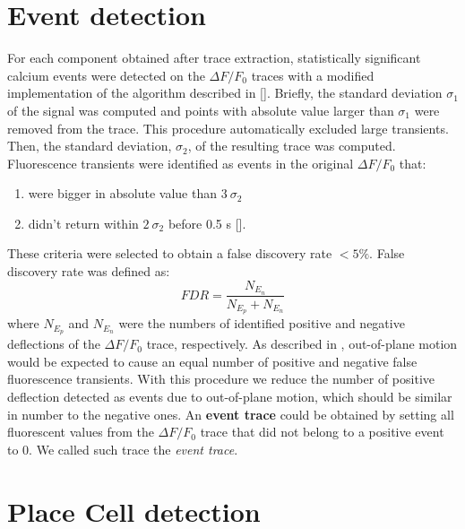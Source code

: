 \section{Event detection}
\label{chap3:sec:6:event_det}
For each component obtained after trace extraction, statistically significant calcium events were detected on the $\Delta F/F_0$ traces with a modified implementation of the algorithm described in [\cite{dombeck2007}]. 
Briefly, the standard deviation $\sigma_1$ of the signal was computed and points with absolute value larger than $\sigma_1$ were removed from the trace. 
This procedure automatically excluded large transients.
Then, the standard deviation, $\sigma_2$, of the resulting trace was computed. 
Fluorescence transients were identified as events in the original $\Delta F/F_0$ that:
\begin{enumerate}[label=\roman*)]
    \item were bigger in absolute value than $3\ \sigma_2$ 
    \item didn't return within $2\ \sigma_2$ before 0.5 s [\cite{dombeck2007}].
\end{enumerate}
These criteria were selected to obtain a false discovery rate $< 5\%$.
False discovery rate was defined as: 
\begin{equation}
    FDR = \frac{N_{E_n}}{N_{E_p}+N_{E_n}}
\end{equation}
where $N_{E_p}$ and $N_{E_n}$ were the numbers of identified positive and negative deflections of the $\Delta F/F_0$ trace, respectively.
As described in \cite{dombeck2007}, out-of-plane motion would be expected to cause an equal number of positive and negative false fluorescence transients.
With this procedure we reduce the number of positive deflection detected as events due to out-of-plane motion, which should be similar in number to the negative ones.
An \textbf{event trace} could be obtained by setting all fluorescent values from the $\Delta F/F_0$ trace that did not belong to a positive event to 0. 
We called such trace the \textit{event trace}.

\section{Place Cell detection}
\label{chap3:sec:7:pc_det}
